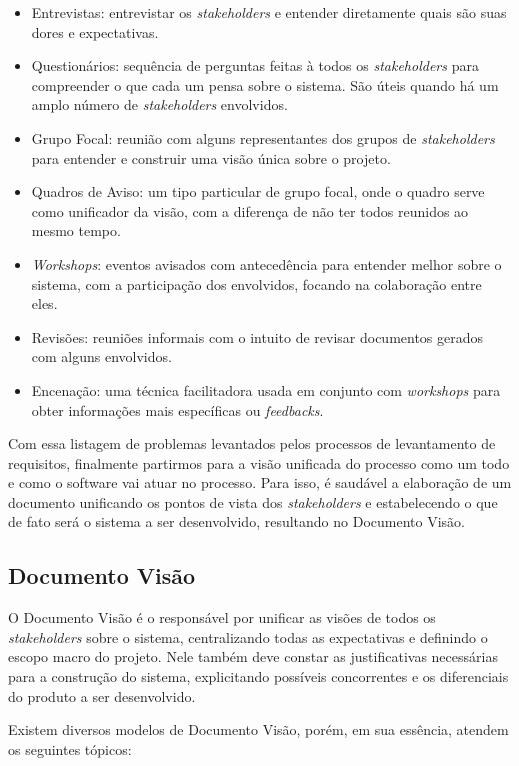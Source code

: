 \begin{itemize}
    \item Entrevistas: entrevistar os \textit{stakeholders} e entender diretamente quais são suas dores e expectativas.
    \item Questionários: sequência de perguntas feitas à todos os \textit{stakeholders} para compreender o que cada um pensa sobre o sistema. São úteis quando há um amplo número de \textit{stakeholders} envolvidos.
    \item Grupo Focal: reunião com alguns representantes dos grupos de \textit{stakeholders} para entender e construir uma visão única sobre o projeto.
    \item Quadros de Aviso: um tipo particular de grupo focal, onde o quadro serve como unificador da visão, com a diferença de não ter todos reunidos ao mesmo tempo.
    \item \textit{Workshops}: eventos avisados com antecedência para entender melhor sobre o sistema, com a participação dos envolvidos, focando na colaboração entre eles.
    \item Revisões: reuniões informais com o intuito de revisar documentos gerados com alguns envolvidos.
    \item Encenação: uma técnica facilitadora usada em conjunto com \textit{workshops} para obter informações mais específicas ou \textit{feedbacks}.
\end{itemize}

Com essa listagem de problemas levantados pelos processos de levantamento de requisitos, finalmente partirmos para a visão unificada do processo como um todo e como o software vai atuar no processo. Para isso, é saudável a elaboração de um documento unificando os pontos de vista dos \textit{stakeholders} e estabelecendo o que de fato será o sistema a ser desenvolvido, resultando no Documento Visão.

\subsection{Documento Visão}
O Documento Visão é o responsável por unificar as visões de todos os \textit{stakeholders} sobre o sistema, centralizando todas as expectativas e definindo o escopo macro do projeto. Nele também deve constar as justificativas necessárias para a construção do sistema, explicitando possíveis concorrentes e os diferenciais do produto a ser desenvolvido.

Existem diversos modelos de Documento Visão, porém, em sua essência, atendem os seguintes tópicos\cite{kurtbittnerianspence2002}:

